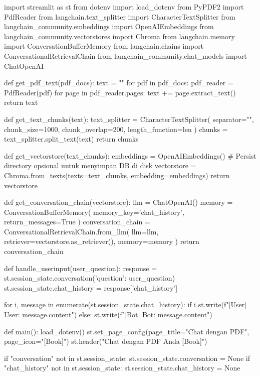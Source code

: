 \begin{codeblock}[language=Python]
import streamlit as st
from dotenv import load_dotenv
from PyPDF2 import PdfReader
from langchain.text_splitter import CharacterTextSplitter
from langchain_community.embeddings import OpenAIEmbeddings
from langchain_community.vectorstores import Chroma
from langchain.memory import ConversationBufferMemory
from langchain.chains import ConversationalRetrievalChain
from langchain_community.chat_models import ChatOpenAI

def get_pdf_text(pdf_docs):
    text = ""
    for pdf in pdf_docs:
        pdf_reader = PdfReader(pdf)
        for page in pdf_reader.pages:
            text += page.extract_text()
    return text

def get_text_chunks(text):
    text_splitter = CharacterTextSplitter(
        separator="\n",
        chunk_size=1000,
        chunk_overlap=200,
        length_function=len
    )
    chunks = text_splitter.split_text(text)
    return chunks

def get_vectorstore(text_chunks):
    embeddings = OpenAIEmbeddings()
    # Persist directory opsional untuk menyimpan DB di disk
    vectorstore = Chroma.from_texts(texts=text_chunks, embedding=embeddings)
    return vectorstore

def get_conversation_chain(vectorstore):
    llm = ChatOpenAI()
    memory = ConversationBufferMemory(
        memory_key='chat_history',
        return_messages=True
    )
    conversation_chain = ConversationalRetrievalChain.from_llm(
        llm=llm,
        retriever=vectorstore.as_retriever(),
        memory=memory
    )
    return conversation_chain

def handle_userinput(user_question):
    response = st.session_state.conversation({'question': user_question})
    st.session_state.chat_history = response['chat_history']

    for i, message in enumerate(st.session_state.chat_history):
        if i %
            st.write(f"[User] User: {message.content}")
        else:
            st.write(f"[Bot] Bot: {message.content}")

def main():
    load_dotenv()
    st.set_page_config(page_title="Chat dengan PDF", page_icon="[Book]")
    st.header("Chat dengan PDF Anda [Book]")

    if "conversation" not in st.session_state:
        st.session_state.conversation = None
    if "chat_history" not in st.session_state:
        st.session_state.chat_history = None


\end{codeblock}

